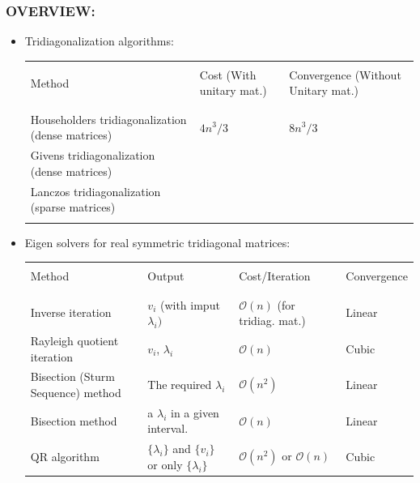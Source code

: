 \documentclass[a4paper,8pt]{beamer} %
\begin{document}
\begin{frame} %
\frametitle{OVERVIEW:}
		\begin{itemize}
			\item Tridiagonalization algorithms:
				\begin{table}
					\begin{Tiny}
						\centering
						\begin{tabular}{lll}
							\hline
							\hline
							\\
							Method & Cost (With unitary mat.) & Convergence (Without Unitary mat.) \\
							\\
							\hline
							\\
							Householders tridiagonalization (dense matrices) 	& $4n^3/3 $ & $ 8n^3/3 $ \\
							Givens tridiagonalization (dense matrices)			& %
							 &  \\
							Lanczos tridiagonalization (sparse matrices)		& & \\
							\\
							\hline
							\hline
						\end{tabular}
					\end{Tiny}
				\end{table}
			\item Eigen solvers for real symmetric tridiagonal matrices:
				\begin{table}
					\begin{Tiny}
						\centering
						\begin{tabular}{llll}
							\hline
							\hline
							\\
							Method & Output & Cost/Iteration & Convergence \\
							\\
							\hline
							\\
							Inverse iteration 			& $v_i$ (with imput $\lambda_{i})$ & $\mathcal O(n)$ (for tridiag. mat.) & Linear\\ 
							Rayleigh quotient iteration & $v_i$, $\lambda_{i}$ & $\mathcal O(n)$ &	Cubic \\
							Bisection (Sturm Sequence) method 	& The required $\lambda_i$ 	& $\mathcal O(n^2)$ & Linear \\
							Bisection method 		& a $\lambda_i$ in a given interval.	& $\mathcal O(n)$ & Linear \\
							QR algorithm 				& $\{\lambda_i\}$ and $\{v_i\}$ or only $\{\lambda_i\}$ & $\mathcal O(n^2)$ or $\mathcal O(n)$ & Cubic\\

\end{tabular}
\end{Tiny}
\end{table}
\end{itemize}
\end{frame}
\end{document}
